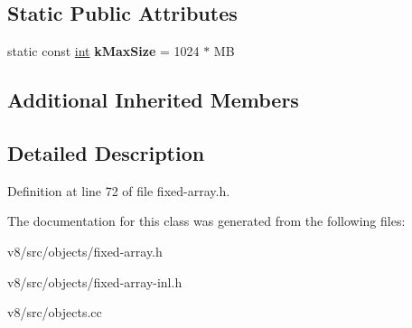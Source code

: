 \subsection*{Static Public Attributes}
\begin{DoxyCompactItemize}
\item 
\mbox{\label{classv8_1_1internal_1_1FixedArrayBase_a80c797860f5328584c6d0093efbdd2f2}} 
static const \mbox{\hyperlink{classint}{int}} {\bfseries k\+Max\+Size} = 1024 $\ast$ MB
\end{DoxyCompactItemize}
\subsection*{Additional Inherited Members}


\subsection{Detailed Description}


Definition at line 72 of file fixed-\/array.\+h.



The documentation for this class was generated from the following files\+:\begin{DoxyCompactItemize}
\item 
v8/src/objects/fixed-\/array.\+h\item 
v8/src/objects/fixed-\/array-\/inl.\+h\item 
v8/src/objects.\+cc\end{DoxyCompactItemize}
